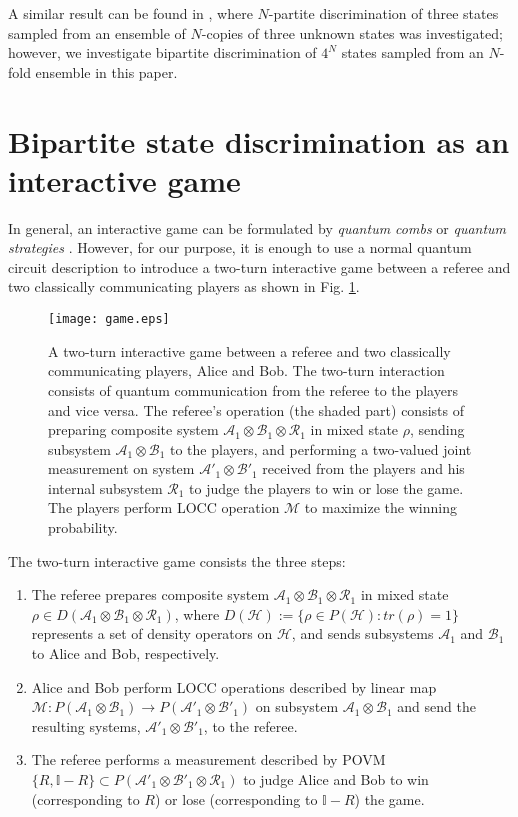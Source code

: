 \documentclass[aps,prx,twocolumn,showpacs,amsmath,notitlepage,amssymb,superscriptaddress]{revtex4-1}
\begin{document}
A similar result can be found in \cite{similar}, where $N$-partite discrimination of three states sampled from an ensemble of $N$-copies of three unknown states was investigated; however, we investigate bipartite discrimination of $4^N$ states sampled from an $N$-fold ensemble in this paper.

\section{Bipartite state discrimination as an interactive game}
In general, an interactive game can be formulated by {\it quantum combs} \cite{comb} or {\it quantum strategies} \cite{strategy}. However, for our purpose, it is enough to use a normal quantum circuit description to introduce a two-turn interactive game between a referee and two classically communicating players as shown in Fig. \ref{fig:game}.
\begin{figure}
 \centering
  \texttt{[image: game.eps]}
  \caption{A two-turn interactive game between a referee and two classically communicating players, Alice and Bob. The two-turn interaction consists of quantum communication from the referee to the players and vice versa. The referee's operation (the shaded part) consists of preparing composite system $\mathcal{A}_1\otimes\mathcal{B}_1\otimes\mathcal{R}_1$ in mixed state $\rho$, sending subsystem $\mathcal{A}_1\otimes\mathcal{B}_1$ to the players, and performing a two-valued joint measurement on system $\mathcal{A}'_1\otimes\mathcal{B}'_1$ received from the players and his internal subsystem $\mathcal{R}_1$ to judge the players to win or lose the game. The players perform LOCC operation $\mathcal{M}$ to maximize the winning probability.}
\label{fig:game}
\end{figure} 
The two-turn interactive game consists the three steps:
\begin{enumerate}
 \item The referee prepares composite system $\mathcal{A}_1\otimes\mathcal{B}_1\otimes\mathcal{R}_1$ in mixed state $\rho \in D(\mathcal{A}_1\otimes\mathcal{B}_1\otimes\mathcal{R}_1)$, where $D(\mathcal{H}):=\{\rho\in P(\mathcal{H}):tr(\rho)=1\}$ represents a set of density operators on $\mathcal{H}$, and sends subsystems $\mathcal{A}_1$ and $\mathcal{B}_1$ to Alice and Bob, respectively.
 
 \item Alice and Bob perform LOCC operations described by linear map $\mathcal{M}:P(\mathcal{A}_1\otimes\mathcal{B}_1)\rightarrow P(\mathcal{A}'_1\otimes\mathcal{B}'_1)$ on subsystem $\mathcal{A}_1\otimes\mathcal{B}_1$ and send the resulting systems, $\mathcal{A}'_1\otimes\mathcal{B}'_1$, to the referee.
 
 \item The referee performs a measurement described by POVM $\{R,\mathbb{I}-R\}\subset P(\mathcal{A}'_1\otimes\mathcal{B}'_1\otimes\mathcal{R}_1)$ to judge Alice and Bob to win (corresponding to $R$) or lose (corresponding to $\mathbb{I}-R$) the game.
\end{enumerate}
\end{document}

